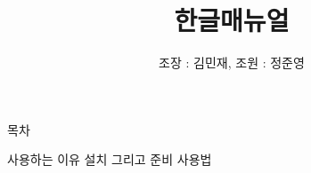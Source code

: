 \documentclass{report}
\title{한글매뉴얼}
\author{조장 : 김민재, 조원 : 정준영}
\date{}
\begin{document}
\begin{CJK}{UTF8}{mj}
\maketitle

\begin{footnotesize}
\Huge
\center
목차 
\end{footnotesize}
\newline
\newline
\newline
사용하는 이유
 \newline
 \newline
설치 그리고 준비
 \newline
 \newline
사용법
\newline
\newline




\end{CJK}
\end{document}

